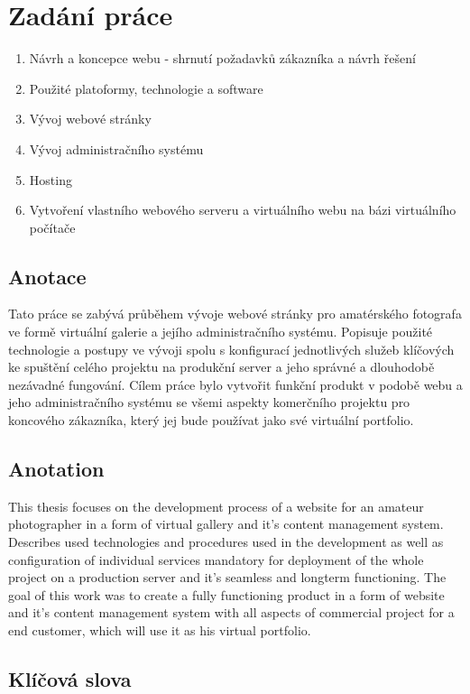 \documentclass[12pt,a4paper]{report}
\begin{document}
  \chapter*{Zadání práce}
  \begin{enumerate}
    \item Návrh a koncepce webu - shrnutí požadavků zákazníka a návrh řešení
    \item Použité platoformy, technologie a software
    \item Vývoj webové stránky
    \item Vývoj administračního systému
    \item Hosting
    \item Vytvoření vlastního webového serveru a virtuálního webu na bázi virtuálního počítače
  \end{enumerate}
  \clearpage


  \section*{Anotace}
  Tato práce se zabývá průběhem vývoje webové stránky pro amatérského 
  fotografa ve formě virtuální galerie a jejího administračního systému.
  Popisuje použité technologie a postupy ve vývoji spolu s konfigurací
  jednotlivých služeb klíčových ke spuštění celého projektu
  na produkční server a jeho správné a dlouhodobě nezávadné fungování.
  Cílem práce bylo vytvořit funkční produkt v podobě webu a jeho administračního
  systému se všemi aspekty komerčního projektu pro koncového zákazníka, 
  který jej bude používat jako své virtuální portfolio.
  
  \section*{Anotation}
  This thesis focuses on the development process of a website for an amateur photographer
  in a form of virtual gallery and it's content management system. Describes used technologies
  and procedures used in the development as well as configuration of individual services mandatory for
  deployment of the whole project on a production server and it's seamless and longterm functioning.
  The goal of this work was to create a fully functioning product in a form of website and it's content management system 
  with all aspects of commercial project for a end customer, which will use it as his virtual portfolio.
  \section*{Klíčová slova}
  
\end{document}
